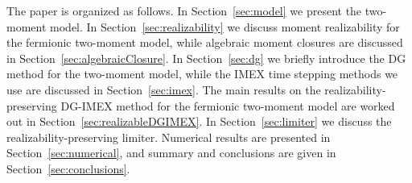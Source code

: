 The paper is organized as follows.  
In Section~\ref{sec:model} we present the two-moment model.  
In Section~\ref{sec:realizability} we discuss moment realizability for the fermionic two-moment model, while algebraic moment closures are discussed in Section~\ref{sec:algebraicClosure}.  
In Section~\ref{sec:dg} we briefly introduce the DG method for the two-moment model, while the IMEX time stepping methods we use are discussed in Section~\ref{sec:imex}.  
The main results on the realizability-preserving DG-IMEX method for the fermionic two-moment model are worked out in Section~\ref{sec:realizableDGIMEX}.  
In Section~\ref{sec:limiter} we discuss the realizability-preserving limiter.  
Numerical results are presented in Section~\ref{sec:numerical}, and summary and conclusions are given in Section~\ref{sec:conclusions}.  